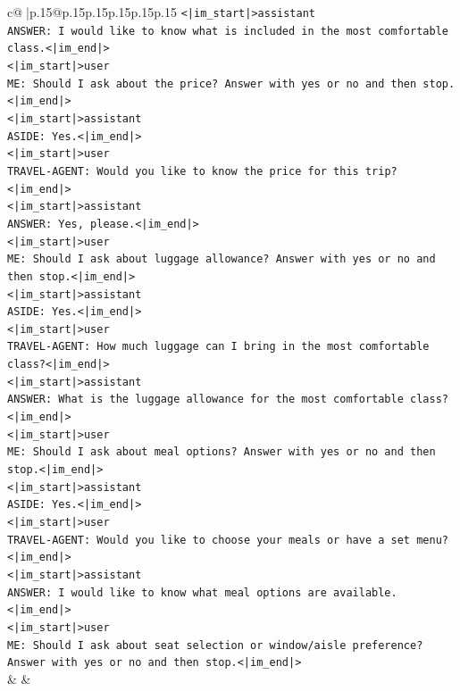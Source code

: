 \documentclass{article}
\begin{document}
{\begin{supertabular}{c@{$\;$}|p{.15\linewidth}@{}p{.15\linewidth}p{.15\linewidth}p{.15\linewidth}p{.15\linewidth}p{.15\linewidth}}
{{{\texttt{<|im\_start|>assistant} \\
\texttt{ANSWER: I would like to know what is included in the most comfortable class.<|im\_end|>} \\
\texttt{<|im\_start|>user} \\
\texttt{ME: Should I ask about the price? Answer with yes or no and then stop.<|im\_end|>} \\
\texttt{<|im\_start|>assistant} \\
\texttt{ASIDE: Yes.<|im\_end|>} \\
\texttt{<|im\_start|>user} \\
\texttt{TRAVEL{-}AGENT: Would you like to know the price for this trip?<|im\_end|>} \\
\texttt{<|im\_start|>assistant} \\
\texttt{ANSWER: Yes, please.<|im\_end|>} \\
\texttt{<|im\_start|>user} \\
\texttt{ME: Should I ask about luggage allowance? Answer with yes or no and then stop.<|im\_end|>} \\
\texttt{<|im\_start|>assistant} \\
\texttt{ASIDE: Yes.<|im\_end|>} \\
\texttt{<|im\_start|>user} \\
\texttt{TRAVEL{-}AGENT: How much luggage can I bring in the most comfortable class?<|im\_end|>} \\
\texttt{<|im\_start|>assistant} \\
\texttt{ANSWER: What is the luggage allowance for the most comfortable class?<|im\_end|>} \\
\texttt{<|im\_start|>user} \\
\texttt{ME: Should I ask about meal options? Answer with yes or no and then stop.<|im\_end|>} \\
\texttt{<|im\_start|>assistant} \\
\texttt{ASIDE: Yes.<|im\_end|>} \\
\texttt{<|im\_start|>user} \\
\texttt{TRAVEL{-}AGENT: Would you like to choose your meals or have a set menu?<|im\_end|>} \\
\texttt{<|im\_start|>assistant} \\
\texttt{ANSWER: I would like to know what meal options are available.<|im\_end|>} \\
\texttt{<|im\_start|>user} \\
\texttt{ME: Should I ask about seat selection or window/aisle preference? Answer with yes or no and then stop.<|im\_end|>} \\
            }
        }
    }
    & & \\ \\


\end{supertabular}}
\end{document}
